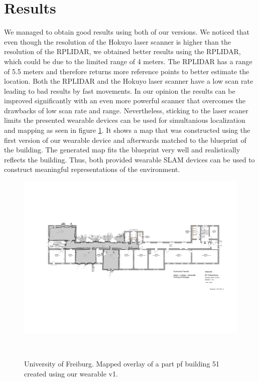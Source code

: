 \documentclass{sigchi-ext}
\begin{document}

\section{Results}
We managed to obtain good results using both of our versions. We noticed that even though the resolution of the Hokuyo laser scanner is higher than the resolution of the RPLIDAR, we obtained better results using the RPLIDAR, which could be due to the limited range of 4 meters. The RPLIDAR has a range of 5.5 meters and therefore returns more reference points to better estimate the location. Both the RPLIDAR and the Hokuyo laser scanner have a low scan rate leading to bad results by fast movements. In our opinion the results can be improved significantly with an even more powerful scanner that overcomes the drawbacks of low scan rate and range. Nevertheless, sticking to the laser scaner limits the presented wearable devices can be used for simultanious localization and mapping as seen in figure \ref{fig:b51map}. It shows a map that was constructed using the first version of our wearable device and afterwards matched to the blueprint of the building. The generated map fits the blueprint very well and realistically reflects the building. Thus, both provided wearable SLAM devices can be used to construct meaningful representations of the environment.

\begin{figure}
	\includegraphics[width=\textwidth]{51.png}
	\caption{University of Freiburg. Mapped overlay of a part pf building 51 created using our wearable v1.}~\label{fig:b51map}
\end{figure}

%
%

\balance{} 
\end{document}
